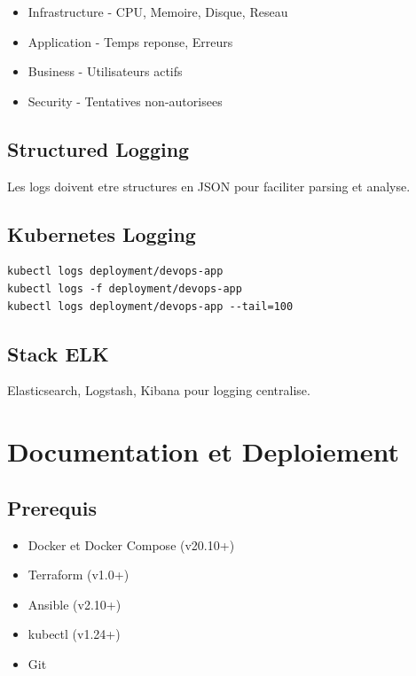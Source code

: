\documentclass[12pt,a4paper]{report}
\begin{document}
\begin{itemize}
    \item Infrastructure - CPU, Memoire, Disque, Reseau
    \item Application - Temps reponse, Erreurs
    \item Business - Utilisateurs actifs
    \item Security - Tentatives non-autorisees
\end{itemize}

\section{Structured Logging}

Les logs doivent etre structures en JSON pour faciliter parsing et analyse.

\section{Kubernetes Logging}

\begin{lstlisting}
kubectl logs deployment/devops-app
kubectl logs -f deployment/devops-app
kubectl logs deployment/devops-app --tail=100
\end{lstlisting}

\section{Stack ELK}

Elasticsearch, Logstash, Kibana pour logging centralise.

\newpage

\chapter{Documentation et Deploiement}

\section{Prerequis}

\begin{itemize}
    \item Docker et Docker Compose (v20.10+)
    \item Terraform (v1.0+)
    \item Ansible (v2.10+)
    \item kubectl (v1.24+)
    \item Git
\end{itemize}
\end{document}
